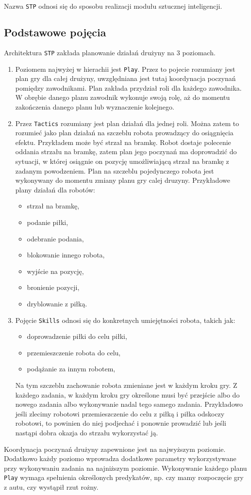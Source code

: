 \documentclass[11pt,onecolumn,a4paper,final]{article}
\begin{document}
 
Nazwa \texttt{STP} odnosi się do sposobu realizacji modułu sztucznej inteligencji.
\subsection*{Podstawowe pojęcia}
Architektura \texttt{STP} zakłada planowanie działań drużyny na 3 poziomach.
\begin{enumerate}
  \item Poziomem najwyżej w hierachii jest \texttt{Play}. Przez to pojecie rozumiany jest plan gry dla całej drużyny, uwzględniana jest tutaj koordynacja
  poczynań pomiędzy zawodnikami. Plan zakłada przydział roli dla każdego zawodnika. W obrębie danego planu zawodnik wykonuje swoją rolę, aż do momentu
  zakończenia danego planu lub wyznaczenie kolejnego.
  \item Przez \texttt{Tactics} rozumiany jest plan działań dla jednej roli. Można zatem to rozumieć jako plan działań na szczeblu robota prowadzący
 do osiągnięcia efektu. Przykładem może być strzał na bramkę. Robot dostaje polecenie oddania strzału na bramkę, zatem plan jego poczynań ma doprowadzić
 do sytuacji, w której osiągnie on pozycję umożliwiającą strzał na bramkę z zadanym powodzeniem.
 Plan na szczeblu pojedynczego robota jest wykonywany do momentu zmiany planu gry calej druzyny.
 Przykładowe plany działań dla robotów:
 \begin{itemize}
  \item strzał na bramkę,
  \item podanie piłki,
  \item odebranie podania,
  \item blokowanie innego robota,
  \item wyjście na pozycję,
  \item bronienie pozycji,
  \item dryblowanie z piłką.
 \end{itemize}

  \item Pojęcie \texttt{Skills} odnosi się do konkretnych umiejętności robota, takich jak:
    \begin{itemize}
    \item doprowadzenie piłki do celu piłki,
    \item przemieszczenie robota do celu,
    \item podążanie za innym robotem,
    \end{itemize}
  Na tym szczeblu zachowanie robota zmieniane jest w każdym kroku gry. Z każdego zadania, w każdym kroku gry określone musi być przejście
  albo do nowego zadania albo wykonywanie nadal tego samego zadania. Przykładowo jeśli zlecimy robotowi przemieszczenie do celu z piłką i piłka 
  odskoczy robotowi, to powinien do niej podjechać i ponownie prowadzić lub jeśli nastąpi dobra okazja do strzału wykorzystać ją.
 
\end{enumerate}
Koordynacja poczynań drużyny zapewnione jest na najwyższym poziomie. Dodatkowo każdy poziomo wprowadza dodatkowe parametry wykorzystywane przy wykonywaniu
zadania na najniższym poziomie.
Wykonywanie każdego planu \texttt{Play} wymaga spełnienia określonych predykatów, np. czy mamy rozpoczęcie gry z autu, czy wystąpił rzut rożny.
\end{document}

